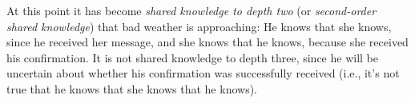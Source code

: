 At this point it has become \emph{shared knowledge to depth two} (or \emph{second-order shared knowledge}) that bad weather is approaching: He knows that she knows, since he received her message, and she knows that he knows, because she received his confirmation. It is not shared knowledge to depth three, since he will be uncertain about whether his confirmation was successfully received (i.e., it's not true that he knows that she knows that he knows). 


